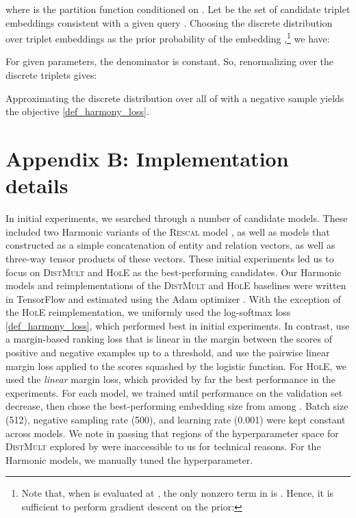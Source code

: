 \documentclass[a4paper,10pt]{article}
\begin{document}
where  is the partition function conditioned on .
Let  be the set of candidate triplet embeddings consistent with a given query . Choosing the discrete distribution  over triplet embeddings as the prior probability of the embedding ,\footnote{Note that, when  is evaluated at , the only nonzero term in  is . Hence, it is sufficient to perform gradient descent on the prior: }
 we have:

For given parameters, the denominator is constant. So, renormalizing over the discrete triplets  gives:

Approximating the discrete distribution over all of  with a negative sample yields the objective \ref{def_harmony_loss}. 

\section{Appendix B: Implementation details}

In initial experiments, we searched through a number of candidate models. These included two Harmonic variants of the \textsc{Rescal} model \citep{nickel2011rescal}, as well as models that constructed  as a simple concatenation of entity and relation vectors, as well as three-way tensor products of these vectors. These initial experiments led us to focus on \textsc{DistMult} and \textsc{HolE} as the best-performing candidates. 
Our Harmonic models and reimplementations of the \textsc{DistMult} and \textsc{HolE} baselines were written in TensorFlow \citep{tensorflow} and estimated using the Adam optimizer \citep{adamoptimizer}. With the exception of the \textsc{HolE} reimplementation, we uniformly used the log-softmax loss \ref{def_harmony_loss}, which performed best in initial experiments. In contrast, \citet{yang2015distmult} use a margin-based ranking loss that is linear in the margin between the scores of positive and negative examples up to a threshold, and \citet{nickel2016hole} use the pairwise linear margin loss applied to the scores squashed by the logistic function. For \textsc{HolE}, we used the \emph{linear} margin loss, which provided by far the best performance in the experiments. For each model, we trained until performance on the validation set decrease, then chose the best-performing embedding size from among . Batch size (512), negative sampling rate (500), and learning rate (0.001) were kept constant across models. We note in passing that regions of the hyperparameter space for \textsc{DistMult} explored by \citet{kaldec2017baselines} were inaccessible to us for technical reasons. For the Harmonic models, we manually tuned the  hyperparameter.
\end{document}
